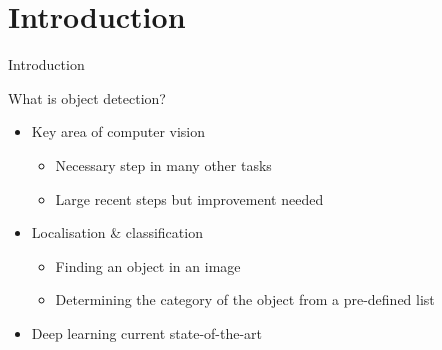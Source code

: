 \section{Introduction}
\begin{frame}{Introduction}{}
    \begin{block}{}
        What is object detection?
        \begin{itemize}
            \item Key area of computer vision
                \begin{itemize}
                    \item Necessary step in many other tasks
                    \item Large recent steps but improvement needed
                \end{itemize}
        \end{itemize}
        \begin{itemize}
            \item Localisation \& classification
                \begin{itemize}
                    \item Finding an object in an image
                    \item Determining the category of the object from a pre-defined list
                \end{itemize}
        \end{itemize}
        \begin{itemize}
            \item Deep learning current state-of-the-art
        \end{itemize}
    \end{block}
\end{frame}

